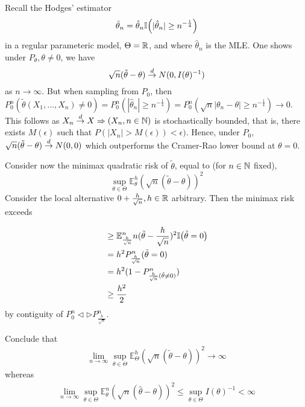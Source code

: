 \begin{exmp}
  \label{defn:parametric_statistical_models:12}
  Recall the Hodges' estimator
  \begin{equation}
    \label{eq:94}
    \tilde \theta_{n} = \hat \theta_{n} \I{|\hat \theta_{n}| \geq n^{-\frac{1}{4}}}
  \end{equation} in a regular parameteric model, $\Theta = \mathbb{R}$, and
  where $\hat \theta_{n}$ is the MLE.  One shows under $P_{\theta},
  \theta \neq 0$, we have
  \begin{equation}
    \label{eq:95}
    \sqrt{n}(\tilde \theta - \theta) \overset{d}{\rightarrow} N(0, I(\theta)^{-1})
  \end{equation} as $n \rightarrow \infty$.  But when sampling from
  $P_{0}$, then $P_{0}^{n} (\tilde \theta(X_{1}, \dots, X_{n}) \neq 0)
  = P_{0}^{n}(|\hat \theta_{n}| \geq n^{-\frac{1}{4}}) =
  P_{0}^{n}(\sqrt{n}|\theta_{n} - \theta| \geq n^{-\frac{1}{4}})
  \rightarrow 0$.
  This follows as $X_{n} \overset{d}{\rightarrow} X \Rightarrow (X_{n}, n \in \mathbb{N})$  is
  stochastically bounded, that is, there exists $M(\epsilon)$ such
  that $P(|X_{n}| > M(\epsilon)) < \epsilon)$.  Hence, under $P_{0}$,
  $\sqrt{n}(\tilde \theta - \theta) \overset{d}{\rightarrow} N(0, 0)$ which outperforms the
  Cramer-Rao lower bound at $\theta = 0$.

  Consider now the minimax quadratic risk of $\tilde \theta$, equal to
  (for $n \in \mathbb{N}$ fixed),
  \begin{equation}
    \label{eq:96}
    \sup_{\theta \in \Theta} \mathbb{E}^{h}_{\theta} (\sqrt{n}(\tilde
    \theta - \theta))^{2}
  \end{equation} Consider the local alternative $0 +
  \frac{h}{\sqrt{n}}, h \in \mathbb{R}$ arbitrary.  Then the minimax risk
  exceeds

  \begin{align}
    \label{eq:97}
    &\geq \mathbb{E}^{n}_{\frac{h}{\sqrt{n}}} n(\tilde \theta -
    \frac{h}{\sqrt{n}})^{2} \I{\tilde \theta = 0} \\
    &= h^{2}P_{\frac{h}{\sqrt{n}}}^{n}(\tilde \theta = 0) \\
    &= h^{2}(1 - P^{n}_{\frac{h}{\sqrt{n}}(\tilde \theta \neq 0)}) \\
    &\geq \frac{h^{2}}{2}
  \end{align} by contiguity of $P_{0}^{n} \lhd \rhd P^{n}_{\frac{h}{\sqrt{n}}}$.

  Conclude that
  \begin{align}
    \label{eq:98}
    \lim_{n \rightarrow \infty} \sup_{\theta \in \Theta}
    \mathbb{E}_{\Theta}^{h}(\sqrt{n}(\tilde \theta - \theta))^{2}
    \rightarrow \infty 
  \end{align} whereas
  \begin{align}
    \label{eq:99}
    \lim_{n \rightarrow \infty} \sup_{\theta \in \Theta}
    \mathbb{E}^{n}_{\theta}(\sqrt{n}(\hat \theta - \theta))^{2} \leq
    \sup_{\theta \in \Theta} I(\theta)^{-1} < \infty
  \end{align}
\end{exmp}


